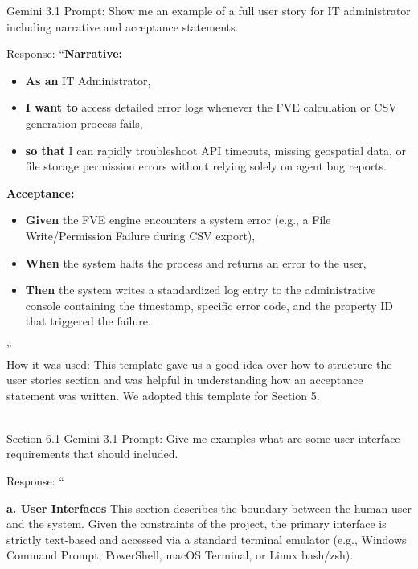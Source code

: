 \documentclass[
]{article}
\begin{document}
Gemini 3.1 Prompt: Show me an example of a full user story for IT
administrator including narrative and acceptance statements.

Response: ``\textbf{Narrative:}

\begin{itemize}
\item
  \textbf{As an} IT Administrator,
\item
  \textbf{I want to} access detailed error logs whenever the FVE
  calculation or CSV generation process fails,
\item
  \textbf{so that} I can rapidly troubleshoot API timeouts, missing
  geospatial data, or file storage permission errors without relying
  solely on agent bug reports.
\end{itemize}

\textbf{Acceptance:}

\begin{itemize}
\item
  \textbf{Given} the FVE engine encounters a system error (e.g., a File
  Write/Permission Failure during CSV export),
\item
  \textbf{When} the system halts the process and returns an error to the
  user,
\item
  \textbf{Then} the system writes a standardized log entry to the
  administrative console containing the timestamp, specific error code,
  and the property ID that triggered the failure.
\end{itemize}

''\\
How it was used: This template gave us a good idea over how to structure
the user stories section and was helpful in understanding how an
acceptance statement was written. We adopted this template for Section
5.\\
\strut \\
\ul{Section 6.1}
Gemini 3.1 Prompt: Give me examples what are some user interface
requirements that should included.

Response: ``

\textbf{a. User Interfaces} This section describes the boundary between
the human user and the system. Given the constraints of the project, the
primary interface is strictly text-based and accessed via a standard
terminal emulator (e.g., Windows Command Prompt, PowerShell, macOS
Terminal, or Linux bash/zsh).
\end{document}
